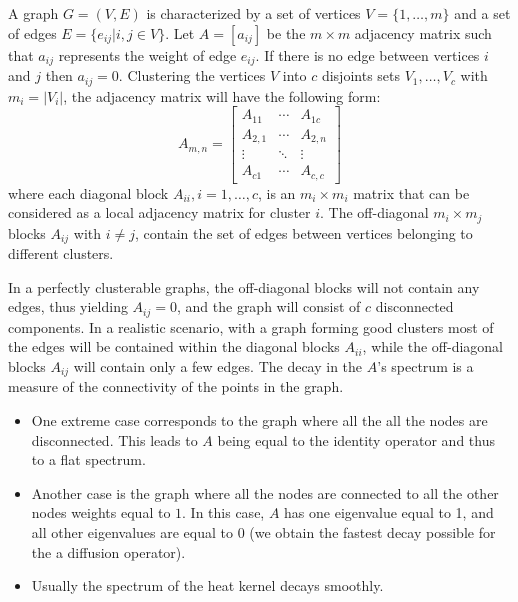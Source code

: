 \documentclass[12pt,letterpaper]{article}
\begin{document}
A graph $G=(V,E)$ is characterized by a set of vertices $V=\{1,\dots,m\}$ and a set of edges $E=\{e_{ij}|i,j \in V\}$.
Let $A=[a_{ij}]$ be the $m\times m$ adjacency matrix such that $a_{ij}$ represents the weight of edge $e_{ij}$. If there is no edge between vertices $i$ and $j$ then $a_{ij}=0$.
Clustering the vertices $V$ into $c$ disjoints sets $V_1, \dots, V_c$ with $m_i=|V_i|$, the adjacency matrix will have
the following form:
\begin{equation}
A_{m,n} =
 \begin{bmatrix}
  A_{11}  & \cdots & A_{1c} \\
  A_{2,1} & \cdots & A_{2,n} \\
  \vdots  & \ddots & \vdots  \\
  A_{c1}  & \cdots & A_{c,c}
 \end{bmatrix}
\end{equation}
where each diagonal block $A_{ii}, i=1,\dots,c$, is an $m_i \times m_i$ matrix that can be considered as a local
adjacency matrix for cluster $i$. The off-diagonal $m_i \times m_j$ blocks $A_{ij}$ with $i \neq j$, contain the
set of edges between vertices belonging to different clusters.

In a perfectly clusterable graphs, the off-diagonal blocks will not contain any edges, thus yielding $A_{ij}=0$,
and the graph will consist of $c$ disconnected components. In a realistic scenario, with a graph forming good clusters
most of the edges will be contained within the diagonal blocks $A_{ii}$, while the off-diagonal blocks $A_{ij}$ will
contain only a few edges.
The decay in the $A$'s spectrum is a measure of the connectivity of the points in the graph.
\begin{itemize}
\item One extreme case corresponds to the graph where all the all the nodes are disconnected. This leads to
$A$ being equal to the identity operator and thus to a flat spectrum.
\item Another case is the graph where all the nodes are connected to all the other nodes weights equal to
$1$. In this case, $A$ has one eigenvalue equal to 1, and all other eigenvalues are equal to 0 (we obtain the
fastest decay possible for the a diffusion operator).
\item Usually the spectrum of the heat kernel decays smoothly. 
\end{itemize}
\end{document}

